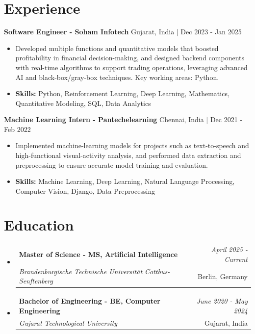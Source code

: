 \documentclass[a4paper,11pt]{article}
\makeatletter
\newcommand{\resumeSubheading}[4]{
\vspace{0.5mm}\item
    \begin{tabular*}{0.98\textwidth}[t]{l@{\extracolsep{\fill}}r}
        \textbf{#1} & \textit{\footnotesize{#4}} \\
        \textit{\footnotesize{#3}} &  \footnotesize{#2}\\
    \end{tabular*}
    \vspace{-2.4mm}
}
\makeatother
\begin{document}
\section{\textbf{Experience}}


\vspace{1mm}
  \textbf{Software Engineer - Soham Infotech} \hfill Gujarat, India | Dec 2023 - Jan 2025
\vspace{-1.5mm} %
\begin{itemize}
  \item Developed multiple functions and quantitative models that boosted profitability in financial decision-making, and designed backend components with real-time algorithms to support trading operations, leveraging advanced AI and black-box/gray-box techniques. Key working areas: Python.

\vspace{-2mm}
  \item \textbf{Skills:} Python, Reinforcement Learning, Deep Learning, Mathematics, Quantitative Modeling, SQL, Data Analytics
\end{itemize}

\vspace{1mm}
  \textbf{Machine Learning Intern - Pantechelearning} \hfill Chennai, India | Dec 2021 - Feb 2022
\vspace{-1.5mm} %
\begin{itemize}
  \item Implemented machine-learning models for projects such as text-to-speech and high-functional visual-activity analysis, and performed data extraction and preprocessing to ensure accurate model training and evaluation.
\vspace{-2mm}
  \item \textbf{Skills:} Machine Learning, Deep Learning, Natural Language Processing, Computer Vision, Django, Data Preprocessing
\end{itemize}\section{\textbf{Education}}
\vspace{-0.4mm}

\begin{itemize}
\resumeSubheading
{Master of Science - MS, Artificial Intelligence }{Berlin, Germany}
{Brandenburgische Technische Universität Cottbus-Senftenberg  }{April 2025 - Current}

\vspace{1.0mm} %
\resumeSubheading
{Bachelor of Engineering - BE, Computer Engineering  }{Gujarat, India}
{Gujarat Technological University }{June 2020 - May 2024}

\end{itemize}
\end{document}
